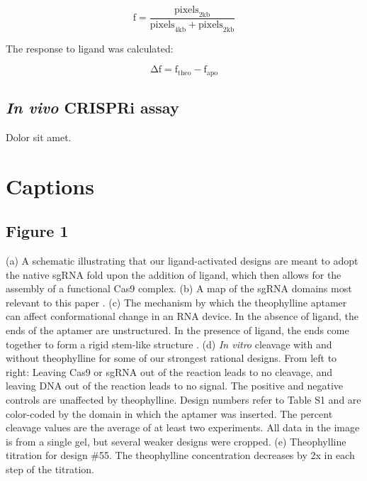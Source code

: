 \documentclass{article}
\begin{document}
\begin{displaymath}
 \mathrm{f} = \frac{\mathrm{pixels}_\mathrm{2kb}}{\mathrm{pixels}_\mathrm{4kb} 
 + \mathrm{pixels}_\mathrm{2kb}}
\end{displaymath}

The response to ligand was calculated: 

\begin{displaymath}
 \mathrm{Δf} = \mathrm{f}_\mathrm{theo} - \mathrm{f}_\mathrm{apo}
\end{displaymath}

\subsection{\emph{In vivo} CRISPRi assay}

Dolor sit amet.

\section{Captions}

\subsection{Figure 1}

(a) A schematic illustrating that our ligand-activated designs are meant to 
adopt the native sgRNA fold upon the addition of ligand, which then allows 
for the assembly of a functional Cas9 complex.
(b) A map of the sgRNA domains most relevant to this paper 
\autocite{briner2014}.
(c) The mechanism by which the theophylline aptamer can affect conformational 
change in an RNA device.  In the absence of ligand, the ends of the aptamer 
are unstructured.  In the presence of ligand, the ends come together to form 
a rigid stem-like structure \autocite{zimmerman1997}.
(d) \emph{In vitro} cleavage with and without theophylline for some of our 
strongest rational designs.  From left to right: Leaving Cas9 or sgRNA out of 
the reaction leads to no cleavage, and leaving DNA out of the reaction leads 
to no signal.  The positive and negative controls are unaffected by 
theophylline.  Design numbers refer to Table S1 and are color-coded by the 
domain in which the aptamer was inserted.  The percent cleavage values are 
the average of at least two experiments.  All data in the image is from a 
single gel, but several weaker designs were cropped.
(e) Theophylline titration for design \#55.  The theophylline concentration 
decreases by 2x in each step of the titration.
\end{document}
